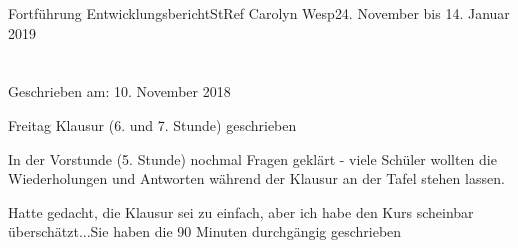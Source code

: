 \documentclass[oneside,openany,headings=optiontotoc,11pt,numbers=noenddot]{article}
\begin{document}
\begin{worksheet}{Fortführung Entwicklungsbericht}{StRef\grq{} Carolyn Wesp}{24. November bis 14. Januar 2019}
		\section*{}
		\tiny{Geschrieben am: 10. November 2018}\small\\
		\par\noindent
		Freitag Klausur (6. und 7. Stunde) geschrieben\\
		\par\noindent		
		In der Vorstunde (5. Stunde) nochmal Fragen geklärt - viele Schüler wollten die Wiederholungen und Antworten während der Klausur an der Tafel stehen lassen.\\
		\par\noindent		
		Hatte gedacht, die Klausur sei zu einfach, aber ich habe den Kurs scheinbar überschätzt...Sie haben die 90 Minuten durchgängig geschrieben
	\end{worksheet}
\end{document}

